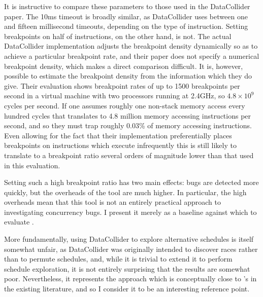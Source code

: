 It is instructive to compare these parameters to those used in the
DataCollider paper.  The 10ms timeout is broadly similar, as
DataCollider uses between one and fifteen millisecond timeouts,
depending on the type of instruction.  Setting breakpoints on half of
instructions, on the other hand, is not.  The actual DataCollider
implementation adjusts the breakpoint density dynamically so as to
achieve a particular breakpoint rate, and their paper does not specify
a numerical breakpoint density, which makes a direct comparison
difficult.  It is, however, possible to estimate the breakpoint
density from the information which they do give.  Their evaluation
shows breakpoint rates of up to 1500 breakpoints per second in a
virtual machine with two processors running at 2.4GHz, so $4.8 \times
10^9$ cycles per second.  If one assumes roughly one non-stack memory
access every hundred cycles that translates to 4.8 million memory
accessing instructions per second, and so they must trap roughly
0.03\% of memory accessing instructions.  Even allowing for the fact
that their implementation preferentially places breakpoints on
instructions which execute infrequently this is still likely to
translate to a breakpoint ratio several orders of magnitude lower than
that used in this evaluation.

Setting such a high breakpoint ratio has two main effects: bugs are
detected more quickly, but the overheads of the tool are much higher.
In particular, the high overheads mean that this tool is not an
entirely practical approach to investigating concurrency bugs.  I
present it merely as a baseline against which to evaluate
{\implementation}.  

More fundamentally, using DataCollider to explore alternative
schedules is itself somewhat unfair, as DataCollider was originally
intended to discover races rather than to permute schedules, and,
while it is trivial to extend it to perform schedule exploration, it
is not entirely surprising that the results are somewhat poor.
Nevertheless, it represents the approach which is conceptually close
to {\technique}'s in the existing literature, and so I consider it to
be an interesting reference point.


